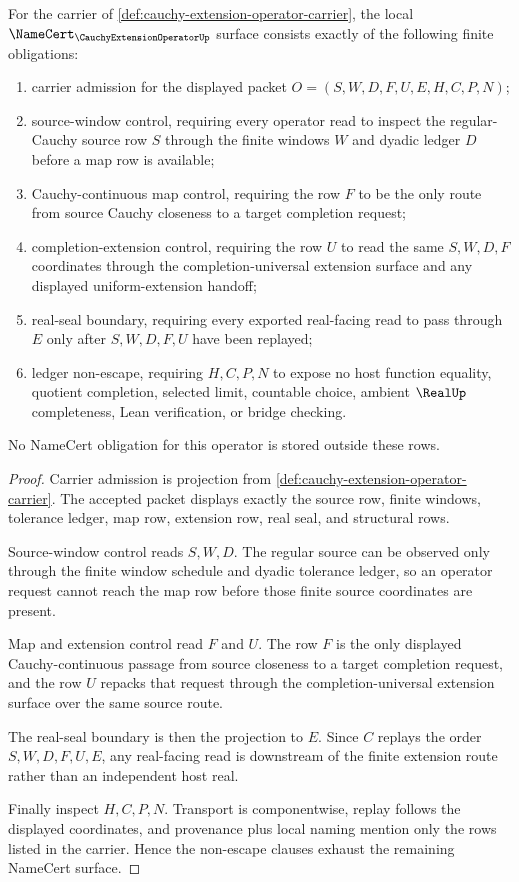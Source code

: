 \begin{theorem}
\label{thm:cauchy-extension-operator-namecert-obligations}
For the carrier of \autoref{def:cauchy-extension-operator-carrier}, the local $\NameCert_{\CauchyExtensionOperatorUp}$ surface consists exactly of the following finite obligations:
\begin{enumerate}
\item carrier admission for the displayed packet $O=(S,W,D,F,U,E,H,C,P,N)$;
\item source-window control, requiring every operator read to inspect the regular-Cauchy source row $S$ through the finite windows $W$ and dyadic ledger $D$ before a map row is available;
\item Cauchy-continuous map control, requiring the row $F$ to be the only route from source Cauchy closeness to a target completion request;
\item completion-extension control, requiring the row $U$ to read the same $S,W,D,F$ coordinates through the completion-universal extension surface and any displayed uniform-extension handoff;
\item real-seal boundary, requiring every exported real-facing read to pass through $E$ only after $S,W,D,F,U$ have been replayed;
\item ledger non-escape, requiring $H,C,P,N$ to expose no host function equality, quotient completion, selected limit, countable choice, ambient $\RealUp$ completeness, Lean verification, or bridge checking.
\end{enumerate}
No NameCert obligation for this operator is stored outside these rows.
\end{theorem}
\begin{proof}
Carrier admission is projection from \autoref{def:cauchy-extension-operator-carrier}. The accepted packet displays exactly the source row, finite windows, tolerance ledger, map row, extension row, real seal, and structural rows.

Source-window control reads $S,W,D$. The regular source can be observed only through the finite window schedule and dyadic tolerance ledger, so an operator request cannot reach the map row before those finite source coordinates are present.

Map and extension control read $F$ and $U$. The row $F$ is the only displayed Cauchy-continuous passage from source closeness to a target completion request, and the row $U$ repacks that request through the completion-universal extension surface over the same source route.

The real-seal boundary is then the projection to $E$. Since $C$ replays the order $S,W,D,F,U,E$, any real-facing read is downstream of the finite extension route rather than an independent host real.

Finally inspect $H,C,P,N$. Transport is componentwise, replay follows the displayed coordinates, and provenance plus local naming mention only the rows listed in the carrier. Hence the non-escape clauses exhaust the remaining NameCert surface.
\end{proof}

